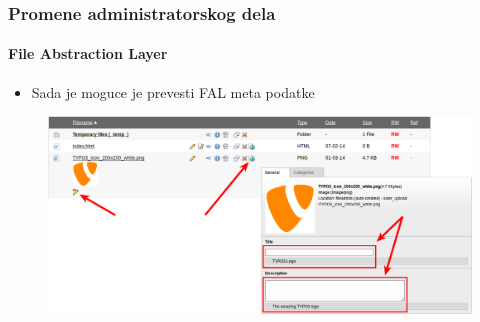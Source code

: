 
\begin{frame}[fragile]
	\frametitle{Promene administratorskog dela}
	\framesubtitle{File Abstraction Layer}

	\begin{itemize}
		\item Sada je moguce je prevesti FAL meta podatke
	\end{itemize}

	\begin{figure}
		\includegraphics[width=0.95\linewidth]{Images/BackendChanges/FalTranslateMetaData.png}
	\end{figure}

\end{frame}


